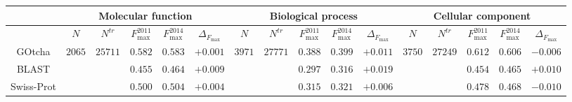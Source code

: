 \begin{tabular}{c|ccccc|ccccc|ccccc}
\hline
& \multicolumn{5}{c|}{Molecular function}
& \multicolumn{5}{c}{Biological process}
& \multicolumn{5}{|c}{Cellular component} \\ \hline \hline
&
$N$ & $N^{tr}$ & $F_{\max}^{2011}$ & $F_{\max}^{2014}$ & $\Delta_{F_{\max}}$ &
$N$ & $N^{tr}$ & $F_{\max}^{2011}$ & $F_{\max}^{2014}$ & $\Delta_{F_{\max}}$ &
$N$ & $N^{tr}$ & $F_{\max}^{2011}$ & $F_{\max}^{2014}$ & $\Delta_{F_{\max}}$ \\ \hline 
GOtcha &
\multirow{3}{*}{$2065$} & \multirow{3}{*}{$25711$} & $0.582$ & $0.583$ & $+0.001$ &
\multirow{3}{*}{$3971$} & \multirow{3}{*}{$27771$} & $0.388$ & $0.399$ & $+0.011$ &
\multirow{3}{*}{$3750$} & \multirow{3}{*}{$27249$} & $0.612$ & $0.606$ & $-0.006$ \\
BLAST &
& & $0.455$ & $0.464$ & $+0.009$ &
& & $0.297$ & $0.316$ & $+0.019$ &
& & $0.454$ & $0.465$ & $+0.010$ \\
Swiss-Prot &
& & $0.500$ & $0.504$ & $+0.004$ &
& & $0.315$ & $0.321$ & $+0.006$ &
& & $0.478$ & $0.468$ & $-0.010$ \\
\hline
\end{tabular}

